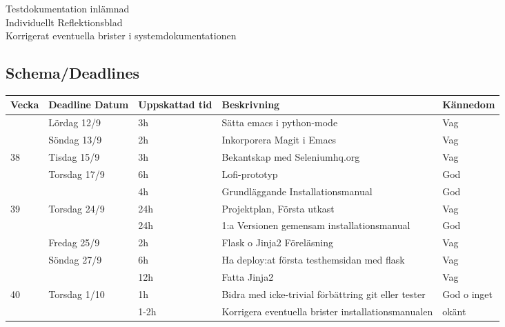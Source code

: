 \documentclass{TDP003mall}
\begin{document}
Testdokumentation inlämnad\\
Individuellt Reflektionsblad\\
Korrigerat eventuella brister i systemdokumentationen\\


\subsection{Schema/Deadlines}

\begin{tabularx}{\linewidth}{|l|l|l|X|l|}
	\hline
	Vecka & Deadline Datum & Uppskattad tid & Beskrivning                                         & Kännedom    \\ [0.5ex]
	\hline
          & Lördag 12/9    & 3h             & Sätta emacs i python-mode                           & Vag         \\
	\hline
          & Söndag 13/9    & 2h             & Inkorporera Magit i Emacs                           & Vag         \\
	\hline
	38    & Tisdag 15/9    & 3h             & Bekantskap med Seleniumhq.org                       & Vag         \\
	\hline
          & Torsdag 17/9   & 6h             & Lofi-prototyp                                       & God         \\
	\hline
          &                & 4h             & Grundläggande Installationsmanual                   & God         \\
	\hline
	39    & Torsdag 24/9   & 24h            & Projektplan, Första utkast                          & Vag         \\
	\hline
          &                & 24h            & 1:a Versionen gemensam installationsmanual          & God         \\
	\hline
          & Fredag 25/9    & 2h             & Flask o Jinja2 Föreläsning                          & Vag         \\
	\hline
          & Söndag 27/9    & 6h             & Ha deploy:at första testhemsidan med flask          & Vag         \\
	\hline
          &                & 12h            & Fatta Jinja2                                        & Vag         \\
	\hline
	40    & Torsdag 1/10   & 1h             & Bidra med icke-trivial förbättring git eller tester & God o inget \\
	\hline
          &                & 1-2h           & Korrigera eventuella brister installationsmanualen  & okänt       \\

\end{tabularx}
\end{document}
